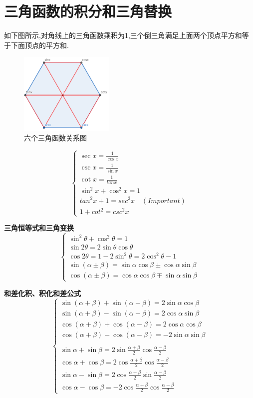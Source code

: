 \documentclass[oneside]{book}
\begin{document}
	\chapter{三角函数的积分和三角替换}
	如下图所示,对角线上的三角函数乘积为1,三个倒三角满足上面两个顶点平方和等于下面顶点的平方和.
	\begin{figure}[htbp]
		\centering
		\includegraphics[width=0.4\textwidth]{picturefour.png}
		\caption{六个三角函数关系图}
	\end{figure}
	$$\left\{\begin{array}{c}
		\sec x=\frac{1}{\cos x}\\\csc x=\frac{1}{\sin x}\\\cot x=\frac{1}{tan x}\\\sin^{2}x+\cos^{2}x=1\\tan^{2}x+1=sec^{2}x\quad (Important)\\1+cot^{2}=csc^{2}x
	\end{array}\right.$$

	\textbf{三角恒等式和三角变换}
	$$\left\{\begin{array}{c}
		\sin^{2} \theta+\cos^{2} \theta=1\\\sin 2\theta=2\sin \theta\cos \theta\\\cos 2\theta=1-2\sin^{2}\theta=2\cos^{2}\theta -1\\\sin (\alpha\pm \beta)=\sin \alpha\cos \beta\pm \cos \alpha\sin\beta\\\cos (\alpha\pm \beta)=\cos \alpha\cos \beta\mp \sin \alpha\sin\beta
	\end{array}\right.$$
	
	\textbf{和差化积、积化和差公式}
	$$\left\{\begin{array}{c}
		\sin (\alpha+\beta)+\sin (\alpha-\beta)=2\sin \alpha\cos\beta\\\sin (\alpha+\beta)-\sin (\alpha-\beta)=2\cos \alpha\sin\beta\\\cos (\alpha+\beta)+\cos (\alpha-\beta)=2\cos \alpha\cos\beta\\\cos (\alpha+\beta)-\cos (\alpha-\beta)=-2\sin \alpha\sin\beta\\\\\sin\alpha+\sin\beta=2\sin\frac{\alpha+\beta}{2}\cos\frac{\alpha-\beta}{2}\\\cos\alpha+\cos\beta=2\cos\frac{\alpha+\beta}{2}\cos\frac{\alpha-\beta}{2}\\\sin\alpha-\sin\beta=2\cos\frac{\alpha+\beta}{2}\sin\frac{\alpha-\beta}{2}\\\cos\alpha-\cos\beta=-2\cos\frac{\alpha+\beta}{2}\cos\frac{\alpha-\beta}{2}
	\end{array}\right.$$
\end{document}
